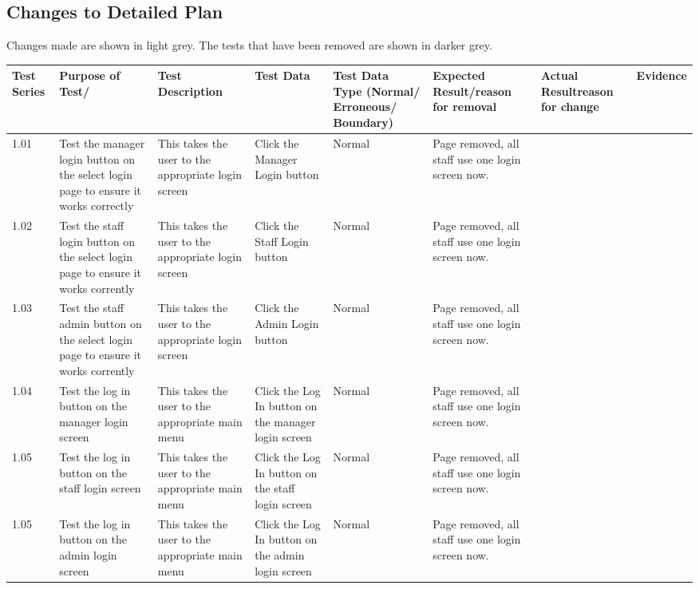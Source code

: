 \begin{landscape}
\begin{center}
\begin{longtable}{|p{1.5cm}|p{2cm}|p{2.5cm}|p{4cm}|p{2cm}|p{2cm}|p{1cm}|p{1.7cm}|}
 
    \end{longtable}
\end{center}


\subsection{Changes to Detailed Plan}

Changes made are shown in light grey. The tests that have been removed are shown in darker grey.

\begin{center}
    \begin{longtable}{|p{1.5cm}|p{2cm}|p{2.5cm}|p{2cm}|p{2cm}|p{2cm}|p{3cm}|p{1.7cm}|}
        \hline
        \textbf{Test Series} & \textbf{Purpose of Test/} & \textbf{Test Description} & \textbf{Test Data} & \textbf{Test Data Type (Normal/ Erroneous/ Boundary)} & \textbf{Expected Result/reason for removal} & \textbf{Actual Resultreason for change} & \textbf{Evidence}\\ \hline
\rowcolor{gray}1.01 & Test the manager login button on the select login page to ensure it works correctly  & This takes the user to the appropriate login screen & Click the Manager Login button & Normal & Page removed, all staff use one login screen now. & & \\ \hline
\rowcolor{gray}1.02 & Test the staff login button on the select login page to ensure it works corrently & This takes the user to the appropriate login screen & Click the Staff Login button & Normal &  Page removed, all staff use one login screen now. && \\ \hline
\rowcolor{gray}1.03 & Test the staff admin button on the select login page to ensure it works corrently & This takes the user to the appropriate login screen & Click the Admin Login button & Normal &  Page removed, all staff use one login screen now. && \\ \hline
\rowcolor{gray}1.04 & Test the log in button on the manager login screen  & This takes the user to the appropriate main menu & Click the Log In button on the manager login screen & Normal &  Page removed, all staff use one login screen now.&& \\ \hline
\rowcolor{gray}1.05 & Test the log in button on the staff login screen  & This takes the user to the appropriate main menu & Click the Log In button on the staff login screen & Normal &  Page removed, all staff use one login screen now.&& \\ \hline
\rowcolor{gray}1.05 & Test the log in button on the admin login screen  & This takes the user to the appropriate main menu & Click the Log In button on the admin login screen & Normal &  Page removed, all staff use one login screen now. && \\ \hline

\end{longtable}
\end{center}
\end{landscape}
